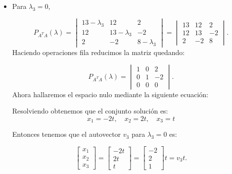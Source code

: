 \begin{frame}
	\begin{itemize}
		\item

		      Para $\lambda_{3}=0$,

		      \begin{equation*}
			      P_{A^{T}A}
			      \left(\lambda\right)=
			      \begin{vmatrix}
				      13 - \lambda_{3} & 12               & 2               \\
				      12               & 13 - \lambda_{3} & -2              \\
				      2                & -2               & 8 - \lambda_{3}
			      \end{vmatrix} =
			      \begin{vmatrix}
				      13 & 12 & 2  \\
				      12 & 13 & -2 \\
				      2  & -2 & 8
			      \end{vmatrix}.
		      \end{equation*}
		      Haciendo operaciones fila reducimos la matriz quedando:

		      \begin{equation*}
			      P_{A^{T}A}
			      \left(\lambda\right)=
			      \begin{vmatrix}
				      1 & 0 & 2  \\
				      0 & 1 & -2 \\
				      0 & 0 & 0
			      \end{vmatrix}.
		      \end{equation*}
		      Ahora hallaremos el espacio nulo mediante la siguiente ecuación:

		      Resolviendo obtenemos que el conjunto solución es:
		      \begin{equation*}
			      x_{1}=-2t,\quad
			      x_{2}=2t,\quad
			      x_{3}=t
		      \end{equation*}

		      Entonces tenemos que el autovector $v_{3}$ para $\lambda_{3}=0$ es:

		      \begin{equation*}
			      \begin{bmatrix}
				      x_{1} \\
				      x_{2} \\
				      x_{3}
			      \end{bmatrix}=
			      \begin{bmatrix}
				      -2t \\
				      2t  \\
				      t
			      \end{bmatrix} =
			      \begin{bmatrix}
				      -2 \\
				      2  \\
				      1
			      \end{bmatrix}t=
			      v_{3}t.
		      \end{equation*}
	\end{itemize}
\end{frame}

